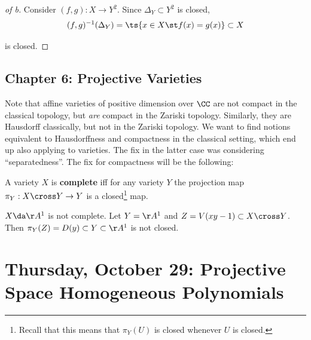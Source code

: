 \begin{proof}[of b]

Consider \((f, g): X\to Y^2\). Since \(\Delta_Y \subset Y^2\) is closed,
\begin{align*}
(f, g)^{-1}(\Delta_Y) = \ts{x\in X \st f(x) = g(x)} \subset X
\end{align*}

is closed.

\end{proof}

\hypertarget{chapter-6-projective-varieties}{%
\subsection{Chapter 6: Projective
Varieties}\label{chapter-6-projective-varieties}}

Note that affine varieties of positive dimension over \(\CC\) are not
compact in the classical topology, but \emph{are} compact in the Zariski
topology. Similarly, they are Hausdorff classically, but not in the
Zariski topology. We want to find notions equivalent to Hausdorffness
and compactness in the classical setting, which end up also applying to
varieties. The fix in the latter case was considering ``separatedness''.
The fix for compactness will be the following:

\begin{definition}[Complete]

A variety \(X\) is \textbf{complete} iff for any variety \(Y\) the
projection map \(\pi_Y:X\cross Y\to Y\) is a closed\footnote{Recall that
  this means that \(\pi_Y(U)\) is closed whenever \(U\) is closed.} map.

\end{definition}

\begin{example}

\(X \da \AA^1\) is not complete. Let \(Y=\AA^1\) and
\(Z = V(xy-1)\subset X\cross Y\). Then
\(\pi_Y(Z) = D(y) \subset Y \subset \AA^1\) is not closed.

\end{example}

\hypertarget{thursday-october-29-projective-space-homogeneous-polynomials}{%
\section{Thursday, October 29: Projective Space Homogeneous
Polynomials}\label{thursday-october-29-projective-space-homogeneous-polynomials}}

